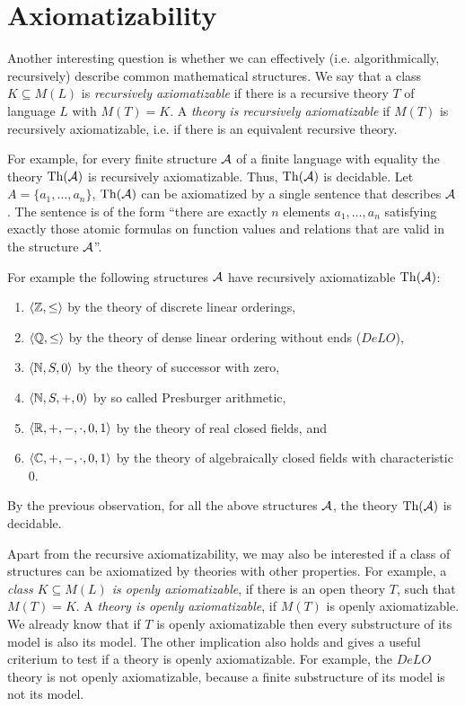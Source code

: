 \section{Axiomatizability}

Another interesting question is whether we can effectively (i.e. algorithmically, recursively) describe common mathematical structures. We say that a class $K \subseteq M(L)$ is \emph{recursively axiomatizable} if there is a recursive theory $T$ of language $L$ with $M(T)=K$. A \emph{theory is recursively axiomatizable} if $M(T)$ is recursively axiomatizable, i.e. if there is an equivalent recursive theory.

For example, for every finite structure $\mathcal{A}$ of a finite language with equality the theory $\operatorname{Th}(\mathcal{A})$ is recursively axiomatizable. Thus, $\operatorname{Th}(\mathcal{A})$ is decidable. Let $A = \{a_1, \dots, a_n\}$, $\operatorname{Th}(\mathcal{A})$ can be axiomatized by a single sentence that describes $\mathcal{A}$. The sentence is of the form ``there are exactly $n$ elements $a_1, \dots, a_n$ satisfying exactly those atomic formulas on function values and relations that are valid in the structure $\mathcal{A}$''.

For example the following structures $\mathcal{A}$ have recursively axiomatizable $\operatorname{Th}(\mathcal{A})$:
\begin{enumerate}
  \item $\langle \mathbb{Z}, \leq \rangle$ by the theory of discrete linear orderings, 
  \item $\langle \mathbb{Q}, \leq \rangle$ by the theory of dense linear ordering without ends ($DeLO$),
  \item $\langle \mathbb{N}, S, 0 \rangle$ by the theory of successor with zero, 
  \item $\langle \mathbb{N}, S, +, 0 \rangle$ by so called Presburger arithmetic, 
  \item $\langle {\ensuremath{\mathbb{R}}}, +, -, \cdot, 0, 1 \rangle$ by the theory of real closed fields, and 
  \item $\langle \mathbb{C}, +, -, \cdot, 0, 1 \rangle$ by the theory of algebraically closed fields with characteristic 0.
\end{enumerate}
By the previous observation, for all the above structures $\mathcal{A}$, the theory $\operatorname{Th}(\mathcal{A})$ is decidable.

Apart from the recursive axiomatizability, we may also be interested if a class of structures can be axiomatized by theories with other properties. For example, a \emph{class $K \subseteq M(L)$ is openly axiomatizable}, if there is an open theory $T$, such that $M(T) = K$. A \emph{theory is openly axiomatizable}, if $M(T)$ is openly axiomatizable. We already know that if $T$ is openly axiomatizable then every substructure of its model is also its model. The other implication also holds and gives a useful criterium to test if a theory is openly axiomatizable. For example, the $DeLO$ theory is not openly axiomatizable, because a finite substructure of its model is not its model.

